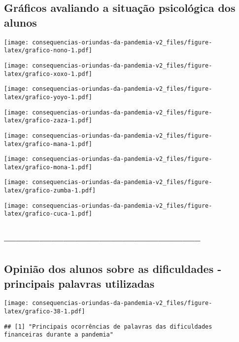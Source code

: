 \documentclass[
]{article}
\begin{document}
\hypertarget{gruxe1ficos-avaliando-a-situauxe7uxe3o-psicoluxf3gica-dos-alunos}{%
\subsection{Gráficos avaliando a situação psicológica dos
alunos}\label{gruxe1ficos-avaliando-a-situauxe7uxe3o-psicoluxf3gica-dos-alunos}}

\texttt{[image: consequencias-oriundas-da-pandemia-v2\_files/figure-latex/grafico-nono-1.pdf]}

\texttt{[image: consequencias-oriundas-da-pandemia-v2\_files/figure-latex/grafico-xoxo-1.pdf]}

\texttt{[image: consequencias-oriundas-da-pandemia-v2\_files/figure-latex/grafico-yoyo-1.pdf]}

\texttt{[image: consequencias-oriundas-da-pandemia-v2\_files/figure-latex/grafico-zaza-1.pdf]}

\texttt{[image: consequencias-oriundas-da-pandemia-v2\_files/figure-latex/grafico-mana-1.pdf]}

\texttt{[image: consequencias-oriundas-da-pandemia-v2\_files/figure-latex/grafico-mona-1.pdf]}

\texttt{[image: consequencias-oriundas-da-pandemia-v2\_files/figure-latex/grafico-zumba-1.pdf]}

\texttt{[image: consequencias-oriundas-da-pandemia-v2\_files/figure-latex/grafico-cuca-1.pdf]}

\hypertarget{section-2}{%
\subsection{--------------------------------------------------}\label{section-2}}

\hypertarget{opiniuxe3o-dos-alunos-sobre-as-dificuldades---principais-palavras-utilizadas}{%
\subsection{Opinião dos alunos sobre as dificuldades - principais
palavras
utilizadas}\label{opiniuxe3o-dos-alunos-sobre-as-dificuldades---principais-palavras-utilizadas}}

\texttt{[image: consequencias-oriundas-da-pandemia-v2\_files/figure-latex/grafico-38-1.pdf]}

\begin{verbatim}
## [1] "Principais ocorrências de palavras das dificuldades financeiras durante a pandemia"
\end{verbatim}
\end{document}
